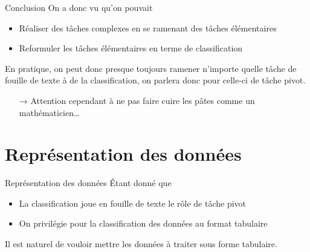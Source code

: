 \documentclass[hyperref={unicode}, xcolor={svgnames}, french]{beamer}
\begin{document}

\begin{frame}{Conclusion}
    On a donc vu qu'on pouvait
    \begin{itemize}
        \item Réaliser des tâches complexes en se ramenant des tâches élémentaires
        \item Reformuler les tâches élémentaires en terme de classification
    \end{itemize}

    En pratique, on peut donc presque toujours ramener n'importe quelle tâche de fouille de texte à de la classification, on parlera donc pour celle-ci de \alert{tâche pivot}.
    \begin{itemize}
        \item[→] Attention cependant à ne pas faire cuire les pâtes comme un mathématicien…
    \end{itemize}
\end{frame}



\section{Représentation des données}

\begin{frame}{Représentation des données}
    Étant donné que
    \begin{itemize}
        \item La classification joue en fouille de texte le rôle de tâche pivot
        \item On privilégie pour la classification des données au format tabulaire
    \end{itemize}
    Il est naturel de vouloir mettre les données à traiter sous forme tabulaire.
\end{frame}

\end{document}
